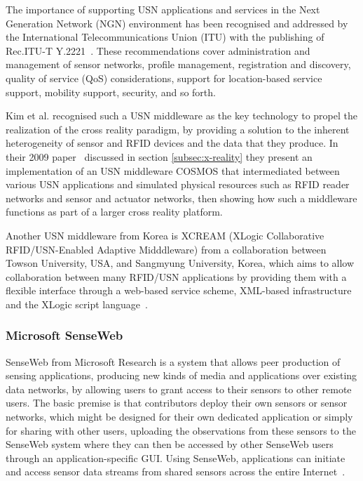 The importance of supporting USN applications and services in the Next Generation Network (NGN) environment has been recognised and addressed by the International Telecommunications Union (ITU) with the publishing of Rec.ITU-T Y.2221~\cite{ITU2010}. These recommendations cover administration and management of sensor networks, profile management, registration and discovery, quality of service (QoS) considerations, support for location-based service support, mobility support, security, and so forth.

Kim et al. recognised such a USN middleware as the key technology to propel the realization of the cross reality paradigm, by providing a solution to the inherent heterogeneity of sensor and RFID devices and the data that they produce. In their 2009 paper~\cite{kim:practical} discussed in section \ref{subsec:x-reality} they present an implementation of an USN middleware COSMOS that intermediated between various USN applications and simulated physical resources such as RFID reader networks and sensor and actuator networks, then showing how such a middleware functions as part of a larger cross reality platform.

Another USN middleware from Korea is XCREAM (XLogic Collaborative RFID/USN-Enabled Adaptive Midddleware) from a collaboration between Towson University, USA, and Sangmyung University, Korea, which aims to allow collaboration between many RFID/USN applications by providing them with a flexible interface through a web-based service scheme, XML-based infrastructure and the XLogic script language~\cite{park:xcream}.

\subsubsection{Microsoft SenseWeb}
SenseWeb from Microsoft Research is a system that allows peer production of sensing applications, producing new kinds of media and applications over existing data networks, by allowing users to grant access to their sensors to other remote users. The basic premise is that contributors deploy their own sensors or sensor networks, which might be designed for their own dedicated application or simply for sharing with other users, uploading the observations from these sensors to the SenseWeb system where they can then be accessed by other SenseWeb users through an application-specific GUI. Using SenseWeb, applications can initiate and access sensor data streams from shared sensors across the entire Internet~\cite{Kansal2007}.

